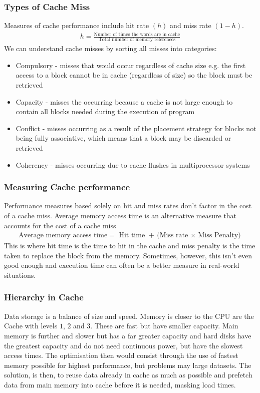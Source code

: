 \documentclass[a4paper]{article}
\theoremstyle{plain}
\theoremstyle{definition}
\theoremstyle{remark}
\begin{document}
\subsubsection{Types of Cache Miss}
Measures of cache performance include hit rate $(h)$ and miss rate $(1-h)$.
\begin{align*}
	h = \frac{\text{Number of times the words are in cache}}{\text{Total number of memory references}}
\end{align*}
We can understand cache misses by sorting all misses into categories:
\begin{itemize}
	\item Compulsory - misses that would occur regardless of cache size e.g. the first access to a block cannot be in cache (regardless of size) so the block must be retrieved
	\item Capacity - misses the occurring because a cache is not large enough to contain all blocks needed during the execution of program
	\item Conflict - misses occurring as a result of the placement strategy for blocks not being fully associative, which means that a block may be discarded or retrieved
	\item Coherency - misses occurring due to cache flushes in multiprocessor systems
\end{itemize}
\subsubsection{Measuring Cache performance}
Performance measures based solely on hit and miss rates don't factor in the cost of a cache miss.
Average memory access time is an alternative measure that accounts for the cost of a cache miss
\begin{align*}
	\text{Average memory access time} = \text{ Hit time } + \text{(Miss rate $\times $ Miss Penalty)}
\end{align*}
This is where hit time is the time to hit in the cache and miss penalty is the time taken to replace the block from the memory. Sometimes, however, this isn't even good enough and execution time can often be a better measure in real-world situations.
\subsubsection{Hierarchy in Cache}
Data storage is a balance of size and speed. Memory is closer to the CPU are the Cache with levels $1$, $2$ and $3$. These are fast but have smaller capacity. Main memory is further and slower but has a far greater capacity and hard disks have the greatest capacity and do not need continuous power, but have the slowest access times. The optimisation then would consist through the use of fastest memory possible for highest performance, but problems may large datasets. The solution, is then, to reuse data already in cache as much as possible and prefetch data from main memory into cache before it is needed, masking load times.
\end{document}
